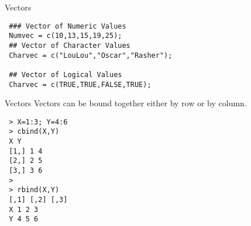 {Vectors}
 \begin{framed}
 \begin{verbatim}
 ### Vector of Numeric Values
 Numvec = c(10,13,15,19,25);
 ## Vector of Character Values
 Charvec = c("LouLou","Oscar","Rasher");
 
 ## Vector of Logical Values
 Charvec = c(TRUE,TRUE,FALSE,TRUE);
 \end{verbatim}
 \end{framed}
 
 
{Vectors}
 Vectors can be bound together either by row or by column.
 \begin{framed}
 \begin{verbatim}
 > X=1:3; Y=4:6
 > cbind(X,Y)
 X Y
 [1,] 1 4
 [2,] 2 5
 [3,] 3 6
 >
 > rbind(X,Y)
 [,1] [,2] [,3]
 X 1 2 3
 Y 4 5 6
 \end{verbatim}
 \end{framed}
 
 

